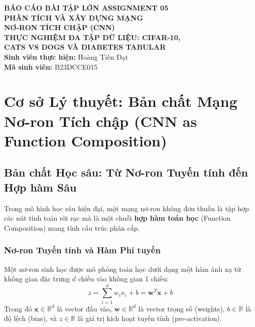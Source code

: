 \documentclass[12pt,a4paper]{report}
\begin{document}
\begin{titlepage}
    \begin{center}
        \vspace*{3.5cm}
        {\LARGE \textbf{BÁO CÁO BÀI TẬP LỚN ASSIGNMENT 05}}\\[1.2cm]
        {\huge \color{navy} \textbf{PHÂN TÍCH VÀ XÂY DỰNG MẠNG\\[0.3cm] NƠ-RON TÍCH CHẬP (CNN)}}\\[1.2cm]
        {\large \textbf{THỰC NGHIỆM ĐA TẬP DỮ LIỆU: CIFAR-10,\\[0.3cm] CATS VS DOGS VÀ DIABETES TABULAR}}\\[3.5cm]
        
        {\Large \textbf{Sinh viên thực hiện:} Hoàng Tiến Đạt}\\[0.5cm]
        {\Large \textbf{Mã sinh viên:} B23DCCE015}
        \vfill
    \end{center}
\end{titlepage}

\tableofcontents

\chapter{Cơ sở Lý thuyết: Bản chất Mạng Nơ-ron Tích chập (CNN as Function Composition)}

\section{Bản chất Học sâu: Từ Nơ-ron Tuyến tính đến Hợp hàm Sâu}
Trong mô hình học sâu hiện đại, một mạng nơ-ron không đơn thuần là tập hợp các nút tính toán rời rạc mà là một chuỗi \textbf{hợp hàm toán học} (Function Composition) mang tính cấu trúc phân cấp.

\subsection{Nơ-ron Tuyến tính và Hàm Phi tuyến}
Một nơ-ron sinh học được mô phỏng toán học dưới dạng một hàm ánh xạ từ không gian đặc trưng $d$ chiều vào không gian 1 chiều:
\begin{equation}
z = \sum_{i=1}^d w_i x_i + b = \mathbf{w}^T \mathbf{x} + b
\end{equation}
Trong đó $\mathbf{x} \in \mathbb{R}^d$ là vector đầu vào, $\mathbf{w} \in \mathbb{R}^d$ là vector trọng số (weights), $b \in \mathbb{R}$ là độ lệch (bias), và $z \in \mathbb{R}$ là giá trị kích hoạt tuyến tính (pre-activation).
\end{document}
